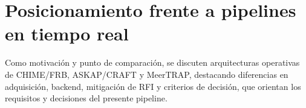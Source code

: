 \section{Posicionamiento frente a pipelines en tiempo real}
Como motivación y punto de comparación, se discuten arquitecturas operativas de CHIME/FRB, ASKAP/CRAFT y MeerTRAP, destacando diferencias en adquisición, backend, mitigación de RFI y criterios de decisión, que orientan los requisitos y decisiones del presente pipeline.
